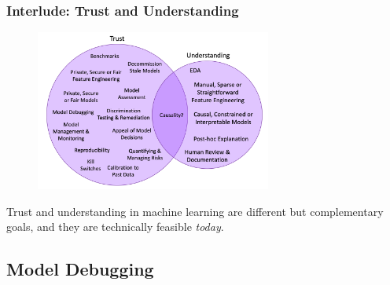 \documentclass[11pt,
               aspectratio=169,
               hyperref={colorlinks}
               ]{beamer}
\begin{document}
			\begin{frame}[t]

  				\frametitle{Interlude: Trust and Understanding}
          
  				\begin{figure}[htb]
    					\begin{center}
      						\includegraphics[height=150pt]{../img/trust_understanding.png}
    					\end{center}
  				\end{figure}
  
  				\vspace{-5pt}
  				\scriptsize{Trust and understanding in machine learning are different but complementary goals, and they are technically feasible \textit{today}}.
    
		\end{frame}

		\subsection{Model Debugging}
\end{document}
